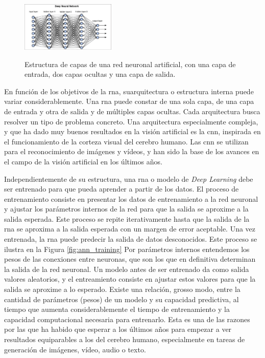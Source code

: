 
\begin{figure}[H]
    \caption[Estructura de capas de una red neuronal artificial]{Estructura de capas de una red neuronal artificial, con una capa de entrada, dos capas ocultas y una capa de salida.}
    \centering
    \includegraphics[width=0.4\textwidth]{./figuras/Deep_neural_network.png}
    \label{fig:deep_neural_network}
\end{figure}

En función de los objetivos de la \gls{rna}, suarquitectura o estructura interna puede variar considerablemente. Una \gls{rna} puede constar de una sola capa, de una capa de entrada y otra de salida y de múltiples capas ocultas. Cada arquitectura busca resolver un tipo de problema concreto. Una arquitectura especialmente compleja, y que ha dado muy buenos resultados en la visión artificial es la \gls{cnn}, inspirada en el funcionamiento de la corteza visual del cerebro humano. Las \gls{cnn} se utilizan para el reconocimiento de imágenes y vídeos, y han sido la base de los avances en el campo de la visión artificial en los últimos años.

Independientemente de su estructura, una \gls{rna} o modelo de \textit{Deep Learning} debe ser entrenado para que pueda aprender a partir de los datos. El proceso de entrenamiento consiste en presentar los datos de entrenamiento a la red neuronal y ajustar los parámetros internos de la red para que la salida se aproxime a la salida esperada. Este proceso se repite iterativamente hasta que la salida de la \gls{rna} se aproxima a la salida esperada con un margen de error aceptable. Una vez entrenada, la \gls{rna} puede predecir la salida de datos desconocidos. Este proceso se ilustra en la Figura \ref{fig:ann_training} Por parámetros internos entendemos los pesos de las conexiones entre neuronas, que son los que en definitiva determinan la salida de la red neuronal. Un modelo antes de ser entrenado da como salida valores aleatorios, y el entreamiento consiste en ajustar estos valores para que la salida se aproxime a lo esperado. Existe una relación, grosso modo, entre la cantidad de parámetros (pesos) de un modelo y su capacidad predictiva, al tiempo que aumenta considerablemente el tiempo de entrenamiento y la capacidad computacional necesaria para entrenarlo. Esta es una de las razones por las que ha habido que esperar a los últimos años para empezar a ver resultados equiparables a los del cerebro humano, especialmente en tareas de generación de imágenes, vídeo, audio o texto.

